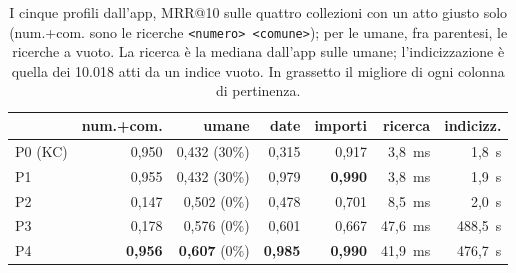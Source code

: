 \begin{table}[ht]
  \centering
  \small
  \setlength{\tabcolsep}{4pt}
  \begin{tabular}{lrrrrrr}
    \toprule
    & num.+com. & umane & date & importi & ricerca & indicizz. \\
    \midrule
    P0 (KC)  & 0,950 & 0,432 (30\%) & 0,315 & 0,917 & 3,8~ms & 1,8~s \\
    P1       & 0,955 & 0,432 (30\%) & 0,979 & \textbf{0,990} & 3,8~ms & 1,9~s \\
    P2       & 0,147 & 0,502 (0\%)  & 0,478 & 0,701 & 8,5~ms & 2,0~s \\
    P3       & 0,178 & 0,576 (0\%)  & 0,601 & 0,667 & 47,6~ms & 488,5~s \\
    P4       & \textbf{0,956} & \textbf{0,607} (0\%) & \textbf{0,985} & \textbf{0,990} & 41,9~ms & 476,7~s \\
    \bottomrule
  \end{tabular}
  \caption{I cinque profili dall'app, MRR@10 sulle quattro collezioni con un
  atto giusto solo (num.+com. sono le ricerche \texttt{<numero> <comune>}); per
  le umane, fra parentesi, le ricerche a vuoto. La
  ricerca è la mediana dall'app sulle umane; l'indicizzazione è quella dei
  10.018 atti da un indice vuoto. In grassetto il migliore di ogni colonna di
  pertinenza.}
  \label{tab:profili-app}
\end{table}

